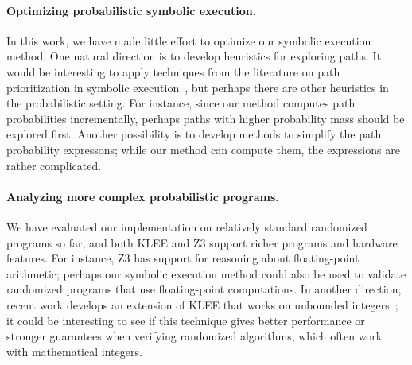 \documentclass[acmsmall,review,anonymous]{acmart}\settopmatter{printfolios=true,printccs=false,printacmref=false}
\begin{document}
\paragraph*{Optimizing probabilistic symbolic execution.}
In this work, we have made little effort to optimize our symbolic execution
method. One natural direction is to develop heuristics for exploring paths. It
would be interesting to apply techniques from the literature on path
prioritization in symbolic execution~\citep{bihuan_2016, p4wn_2021}, but perhaps there are other
heuristics in the probabilistic setting. For instance, since our method computes
path probabilities incrementally, perhaps paths with higher probability mass
should be explored first. Another possibility is to develop methods to simplify
the path probability expressons; while our method can compute them, the
expressions are rather complicated.

\paragraph*{Analyzing more complex probabilistic programs.}
We have evaluated our implementation on relatively standard randomized programs
so far, and both KLEE and Z3 support richer programs and hardware features. For
instance, Z3 has support for reasoning about floating-point arithmetic; perhaps
our symbolic execution method could also be used to validate randomized programs
that use floating-point computations. In another direction, recent work develops
an extension of KLEE that works on unbounded integers~\citep{kapus_2019}; it
could be interesting to see if this technique gives better performance or
stronger guarantees when verifying randomized algorithms, which often work with
mathematical integers.

\begin{acks}                            %
\end{acks}



\end{document}

